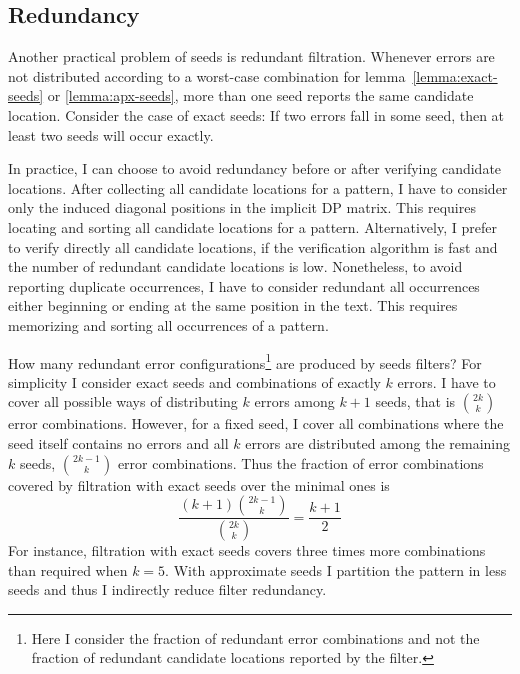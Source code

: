 \subsection{Redundancy}

Another practical problem of seeds is redundant filtration.
Whenever errors are not distributed according to a worst-case combination for lemma~\ref{lemma:exact-seeds} or \ref{lemma:apx-seeds}, more than one seed reports the same candidate location.
Consider the case of exact seeds: If two errors fall in some seed, then at least two seeds will occur exactly.

In practice, I can choose to avoid redundancy before or after verifying candidate locations.
After collecting all candidate locations for a pattern, I have to consider only the induced diagonal positions in the implicit DP matrix.
This requires locating and sorting all candidate locations for a pattern.
Alternatively, I prefer to verify directly all candidate locations, \eg if the verification algorithm is fast and the number of redundant candidate locations is low.
Nonetheless, to avoid reporting duplicate occurrences, I have to consider redundant all occurrences either beginning or ending at the same position in the text.
This requires memorizing and sorting all occurrences of a pattern.

How many redundant error configurations\footnote{Here I consider the fraction of redundant error combinations and not the fraction of redundant candidate locations reported by the filter.} are produced by seeds filters?
For simplicity I consider exact seeds and combinations of exactly $k$ errors.
I have to cover all possible ways of distributing $k$ errors among $k+1$ seeds, that is $\binom{2k}{k}$ error combinations.
However, for a fixed seed, I cover all combinations where the seed itself contains no errors and all $k$ errors are distributed among the remaining $k$ seeds, \ie $\binom{2k-1}{k}$ error combinations.
Thus the fraction of error combinations covered by filtration with exact seeds over the minimal ones is
\begin{equation}
\frac{(k+1)\binom{2k-1}{k}}{\binom{2k}{k}} = \frac{k+1}{2}
\end{equation}
For instance, filtration with exact seeds covers three times more combinations than required when $k=5$.
With approximate seeds I partition the pattern in less seeds and thus I indirectly reduce filter redundancy.

